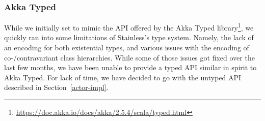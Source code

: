 \documentclass[a4paper,twoside]{article}
\newcommand{\RefSec}[1]{Section~\ref{#1}}
\newcommand{\RefFig}[1]{Figure~\ref{#1}}
\newcommand{\stt}[1]{\texttt{\small{#1}}}
\begin{document}
\subsubsection*{Akka Typed}

While we initially set to mimic the API offered by the Akka Typed library\footnote{\url{https://doc.akka.io/docs/akka/2.5.4/scala/typed.html}}, we quickly ran into some limitations of Stainless's type system. Namely, the lack of an encoding for both existential types, and various issues with the encoding of co-/contravariant class hierarchies. While some of those issues got fixed over the last few months, we have been unable to provide a typed API similar in spirit to Akka Typed. For lack of time, we have decided to go with the untyped API described in \RefSec{actor-impl}.

%
\end{document}
